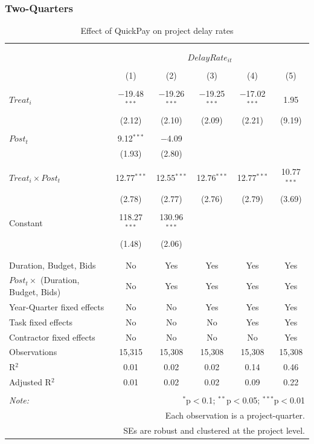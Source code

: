 \documentclass[
]{article}
\begin{document}
\hypertarget{two-quarters-2}{%
\subsubsection{Two-Quarters}\label{two-quarters-2}}

\begin{table}[H] \centering 
  \caption{Effect of QuickPay on project delay rates} 
  \label{} 
\small 
\begin{tabular}{@{\extracolsep{-2pt}}lccccc} 
\\[-1.8ex]\hline 
\hline \\[-1.8ex] 
\\[-1.8ex] & \multicolumn{5}{c}{$DelayRate_{it}$} \\ 
\\[-1.8ex] & (1) & (2) & (3) & (4) & (5)\\ 
\hline \\[-1.8ex] 
 $Treat_i$ & $-$19.48$^{***}$ & $-$19.26$^{***}$ & $-$19.25$^{***}$ & $-$17.02$^{***}$ & 1.95 \\ 
  & (2.12) & (2.10) & (2.09) & (2.21) & (9.19) \\ 
  & & & & & \\ 
 $Post_t$ & 9.12$^{***}$ & $-$4.09 &  &  &  \\ 
  & (1.93) & (2.80) &  &  &  \\ 
  & & & & & \\ 
 $Treat_i \times Post_t$ & 12.77$^{***}$ & 12.55$^{***}$ & 12.76$^{***}$ & 12.77$^{***}$ & 10.77$^{***}$ \\ 
  & (2.78) & (2.77) & (2.76) & (2.79) & (3.69) \\ 
  & & & & & \\ 
 Constant & 118.27$^{***}$ & 130.96$^{***}$ &  &  &  \\ 
  & (1.48) & (2.06) &  &  &  \\ 
  & & & & & \\ 
\hline \\[-1.8ex] 
Duration, Budget, Bids & No & Yes & Yes & Yes & Yes \\ 
$Post_t \times$  (Duration, Budget, Bids) & No & Yes & Yes & Yes & Yes \\ 
Year-Quarter fixed effects & No & No & Yes & Yes & Yes \\ 
Task fixed effects & No & No & No & Yes & Yes \\ 
Contractor fixed effects & No & No & No & No & Yes \\ 
Observations & 15,315 & 15,308 & 15,308 & 15,308 & 15,308 \\ 
R$^{2}$ & 0.01 & 0.02 & 0.02 & 0.14 & 0.46 \\ 
Adjusted R$^{2}$ & 0.01 & 0.02 & 0.02 & 0.09 & 0.22 \\ 
\hline 
\hline \\[-1.8ex] 
\textit{Note:}  & \multicolumn{5}{r}{$^{*}$p$<$0.1; $^{**}$p$<$0.05; $^{***}$p$<$0.01} \\ 
 & \multicolumn{5}{r}{Each observation is a project-quarter.} \\ 
 & \multicolumn{5}{r}{SEs are robust and clustered at the project level.} \\ 
\end{tabular} 
\end{table}
\end{document}
